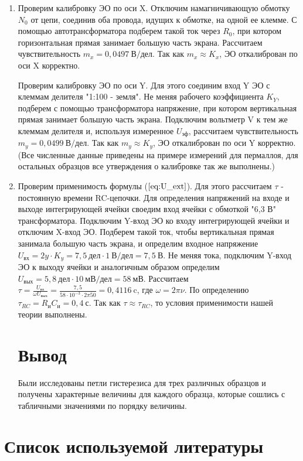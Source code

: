 \begin{enumerate}
\item Проверим калибровку ЭО по оси X. Отключим намагничивающую обмотку $N_0$ от цепи, соединив оба провода, идущих к обмотке, на одной ее клемме. С помощью автотрансформатора подберем такой ток через $R_0$, при котором горизонтальная прямая занимает большую часть экрана. Рассчитаем чувствительность $m_x=0,0497\ \text{В/дел}$. Так как $m_x\approx K_x$, ЭО откалиброван по оси X корректно.

Проверим калибровку ЭО по оси Y. Для этого соединим вход Y ЭО с клеммам делителя "1:100 - земля". Не меняя рабочего коэффициента $K_Y$, подберем с помощью трансформатора напряжение, при котором вертикальная прямая занимает большую часть экрана. Подключим вольтметр V к тем же клеммам делителя и, используя измеренное $U_{\text{эф}}$, рассчитаем чувствительность $m_y=0,0499\ \text{В/дел}$. Так как $m_y\approx K_y$, ЭО откалиброван по оси Y корректно. (Все численные данные приведены на примере измерений для пермаллоя, для остальных образцов все утверждения о калибровке так же выполнены.)  

\item Проверим применимость формулы ($\ref{eq:U_ext}$). Для этого рассчитаем $\tau$ - постоянную времени RC-цепочки. Для определения напряжений на входе и выходе интегрирующей ячейки своедим вход ячейки с обмоткой "6,3 В" трансформатора. Подключим Y-вход ЭО ко входу интегрирующей ячейки и отключим X-вход ЭО. Подберем такой ток, чтобы вертикальная прямая занимала большую часть экрана, и определим входное напряжение $U_{\text{вх}}=2y\cdot K_y=7,5\ дел \cdot 1\ \text{В/дел} = 7,5\ \text{В}$. Не меняя тока, подключим Y-вход ЭО к выходу ячейки и аналогичным образом определим $U_{вых}=5,8\ дел\cdot 10\ \text{мВ/дел} = 58\ \text{мВ}$. Рассчитаем $\tau=\frac{U_{\text{вх}}}{\omega U_{\text{вых}}}=\frac{7,5}{58\cdot10^{-3}\cdot2\pi 50}=0,4116\ \text{c}$, где $\omega=2\pi\nu$. По определению $\tau_{RC}=R_иC_и=0,4\ \text{с}$. Так как $\tau\approx\tau_{RC}$, то условия применимости нашей теории выполнены.

\section{Вывод} 
Были исследованы петли гистерезиса для трех различных образцов и получены характерные величины для каждого образца, которые сошлись с табличными значениями по порядку величины. 
\end{enumerate}

\section{{Список используемой литературы}}


